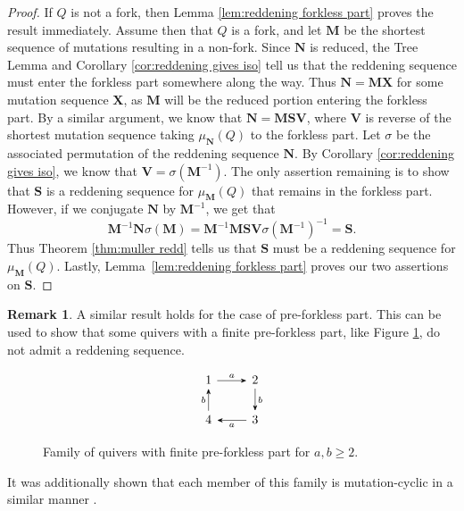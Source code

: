 \documentclass[11pt, letterpaper]{amsart}
\theoremstyle{definition}
\newtheorem{remark}[theorem]{Remark}
\numberwithin{equation}{section}
\begin{document}
\begin{proof}
    If $Q$ is not a fork, then Lemma \ref{lem:reddening forkless part} proves the result immediately.
    Assume then that $Q$ is a fork, and let $\mathbf{M}$ be the shortest sequence of mutations resulting in a non-fork.
    Since $\mathbf{N}$ is reduced, the Tree Lemma \cite{warkentin2014exchange} and Corollary \ref{cor:reddening gives iso} tell us that the reddening sequence must enter the forkless part somewhere along the way.
    Thus $\mathbf{N} = \mathbf{MX}$ for some mutation sequence $\mathbf{X}$, as $\mathbf{M}$ will be the reduced portion entering the forkless part.
    By a similar argument, we know that $\mathbf{N} = \mathbf{MSV}$, where $\mathbf{V}$ is reverse of the shortest mutation sequence taking $\mu_{\mathbf{N}}(Q)$ to the forkless part.
    Let $\sigma$ be the associated permutation of the reddening sequence $\mathbf N$.
    By Corollary \ref{cor:reddening gives iso}, we know that $\mathbf{V} = \sigma(\mathbf{M}^{-1})$.
    The only assertion remaining is to show that $\mathbf{S}$ is a reddening sequence for $\mu_{\mathbf{M}}(Q)$ that remains in the forkless part.
    However, if we conjugate $\mathbf{N}$ by $\mathbf{M}^{-1}$, we get that 
    $$\mathbf{M}^{-1}\mathbf{N} \sigma(\mathbf{M})  = \mathbf{M}^{-1}\mathbf{M S V }\sigma(\mathbf{M}^{-1})^{-1}  = \mathbf{S}.$$
    Thus Theorem \ref{thm:muller redd} tells us that $\mathbf{S}$ must be a reddening sequence for $\mu_{\mathbf{M}}(Q)$. Lastly,  
    Lemma~\ref{lem:reddening forkless part} proves our two assertions on $\mathbf{S}$.
\end{proof}

\begin{remark} \label{rmk:reddening-pre-forks}
    A similar result holds for the case of pre-forkless part.
    This can be used to show that some quivers with a finite pre-forkless part, like Figure \ref{fig:box quiver}, do not admit a reddening sequence.
    
    \begin{figure}[ht]
        \centering
        \[\begin{tikzcd}[every arrow/.append style = {-{Stealth}}]
            1 & 2 \\
            4 & 3
            \arrow[from=1-1,to=1-2, "a"]
            \arrow[from=1-2,to=2-2, "b"]
            \arrow[from=2-2,to=2-1, "a"]
            \arrow[from=2-1,to=1-1, "b"]
        \end{tikzcd}\]
        \caption{Family of quivers with finite pre-forkless part for $a,b \geq 2$.}
        \label{fig:box quiver}
    \end{figure}
    
    It was additionally shown that each member of this family is mutation-cyclic in a similar manner \cite{warkentin2014exchange}.
\end{remark}
\end{document}
